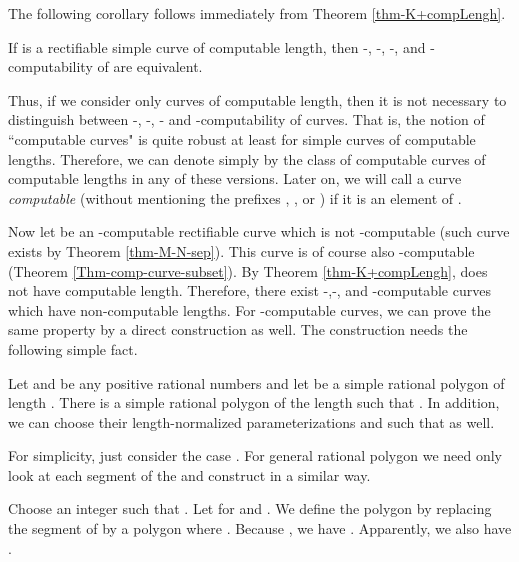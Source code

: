 \documentclass{LMCS}
\theoremstyle{plain}
\begin{document}
The following corollary follows immediately from Theorem \ref{thm-K+compLengh}.

\begin{cor}\label{cor-equi-compLength}
If  is a rectifiable simple curve of computable length, then -, -, -, and -computability of  are equivalent.
\end{cor}

Thus, if we consider only curves of computable length, then it is not necessary to distinguish between -, -, - and -computability of curves. That is, the notion of ``computable curves" is quite robust at least for simple curves of computable lengths.
Therefore, we can denote simply by  the class of computable curves of computable lengths in any of these versions. Later on, we will call a curve {\em computable} (without mentioning the prefixes , ,  or ) if it is an element of .

Now let  be an -computable rectifiable curve which is not -computable (such curve exists by Theorem \ref{thm-M-N-sep}). This curve  is of course also -computable (Theorem \ref{Thm-comp-curve-subset}). By Theorem \ref{thm-K+compLengh},  does not have computable length. Therefore, there exist -,-, and -computable curves which have non-computable lengths.  For -computable curves, we can prove the same property by a direct construction as well. The construction needs the following simple fact.

\begin{prop}\label{prop-polygon-a<b}
Let  and  be any positive rational numbers and let  be a simple rational polygon of length . There is a simple rational polygon  of the length  such that . In addition, we can choose their length-normalized parameterizations  and  such that  as well.
\end{prop}
\proof
For simplicity, just consider the case . For general rational polygon  we need only look at each segment of the  and construct  in a similar way.

Choose an integer  such that . Let   for  and . We define the polygon  by replacing the segment  of  by a polygon  where . Because , we have . Apparently, we also have .
\end{document}
